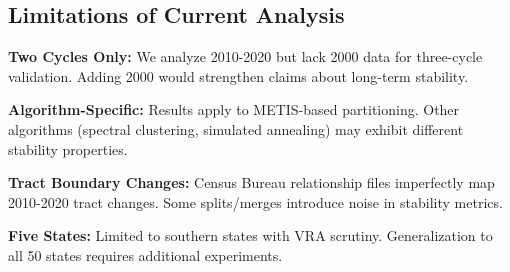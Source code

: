 \subsection{Limitations of Current Analysis}

\textbf{Two Cycles Only:} We analyze 2010-2020 but lack 2000 data for three-cycle validation. Adding 2000 would strengthen claims about long-term stability.

\textbf{Algorithm-Specific:} Results apply to METIS-based partitioning. Other algorithms (spectral clustering, simulated annealing) may exhibit different stability properties.

\textbf{Tract Boundary Changes:} Census Bureau relationship files imperfectly map 2010-2020 tract changes. Some splits/merges introduce noise in stability metrics.

\textbf{Five States:} Limited to southern states with VRA scrutiny. Generalization to all 50 states requires additional experiments.
